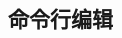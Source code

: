 \documentclass[class=book, crop=false]{standalone}
\begin{document}
\begin{CJK}{UTF8}{gbsn}

\chapter{命令行编辑}













\cleardoublepage

\end{CJK}
\end{document}
